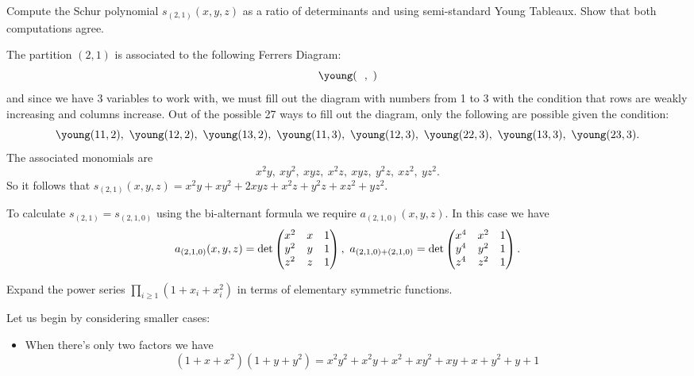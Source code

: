 \documentclass[12pt]{memoir}
\begin{document}
\begin{Ej}[Exercise 5]
    Compute the Schur polynomial $s_{(2,1)}(x,y,z)$ as a ratio of determinants and using semi-standard Young Tableaux. Show that both computations agree.
   \end{Ej}
\begin{ptcbr}
    The partition $(2,1)$ is associated to the following Ferrers Diagram:
    $$\young(~~,~)$$
    and since we have 3 variables to work with, we must fill out the diagram with numbers from 1 to 3 with the condition that rows are weakly increasing and columns increase. Out of the possible 27 ways to fill out the diagram, only the following are possible given the condition:
    $$\young(11,2),\ \young(12,2),\ \young(13,2),\ \young(11,3),\ \young(12,3),\ \young(22,3),\ \young(13,3),\ \young(23,3).$$ 
    The associated monomials are 
    $$x^2y,\ xy^2,\ xyz,\ x^2z,\ xyz,\ y^2z,\ xz^2,\ yz^2.$$
    So it follows that $s_{(2,1)}(x,y,z)=x^2y+xy^2+2xyz+x^2z+y^2z+xz^2+yz^2$.\par 
    To calculate $s_{(2,1)}=s_{(2,1,0)}$ using the bi-alternant formula we require $a_{(2,1,0)}(x,y,z)$. In this case we have 
    $$a_{(2,1,0)}(x,y,z)=\det\threebythree{x^2}{x}{1}{y^2}{y}{1}{z^2}{z}{1},\ a_{(2,1,0)+(2,1,0)}=\det\threebythree{x^4}{x^2}{1}{y^4}{y^2}{1}{z^4}{z^2}{1}.$$
\end{ptcbr}

\begin{Ej}
    Expand the power series $\prod_{i\geq 1}(1+x_i+x_i^2)$ in terms of elementary symmetric functions.
   \end{Ej}

\begin{ptcbr}
Let us begin by considering smaller cases:
\begin{itemize}
    \itemsep=-0.4em
    \item When there's only two factors we have 
$$(1+x+x^2)(1+y+y^2)=x^2 y^2 + x^2 y + x^2 + x y^2 + x y + x + y^2 + y + 1$$
\end{itemize}
\end{ptcbr}
\end{document}
